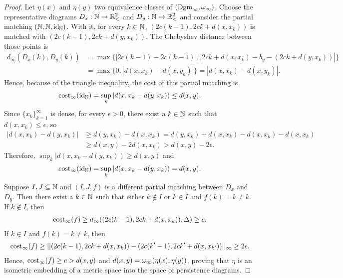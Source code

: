 \begin{proof}
    Let $ \eta(x) $ and $ \eta(y) $ two equivalence classes of $ (\operatorname{Dgm}_\infty, \omega_\infty) $. Choose the representative diagrams $D_x : \mathbb N \to \mathbb{R}_<^2 $ and $D_y : \mathbb N \to \mathbb{R}_<^2 $ and consider the partial matching $ (\mathbb N, \mathbb N, \operatorname{id}_\mathbb N) $. With it, for every $ k \in \mathbb N $, $ (2c(k-1), 2ck + d(x, x_k)) $ is matched with $ (2c(k-1), 2ck + d(y, x_k)) $. The Chebyshev distance between those points is
    \begin{align*}
        d_\infty(D_x(k), D_y(k)) &= \max \{|2c(k-1) - 2c(k-1)|, |2ck + d(x, x_k) - b_y - (2ck + d(y, x_k))|\} \\
        &= \max \{0, |d(x, x_k) - d(x, y_k)|\} = |d(x, x_k) - d(x, y_k)|.
    \end{align*}
    Hence, because of the triangle inequality, the cost of this partial matching is
    \begin{align*}
        \operatorname{cost}_\infty(\operatorname{id}_\mathbb N) = \sup_k |d(x, x_k - d(y, x_k)) \leq d(x, y).
    \end{align*}
    Since $ \{ x_k \}_{k=1}^\infty $ is dense, for every $ \epsilon > 0 $, there exist a $ k \in \mathbb N $ such that $ d(x, x_k) \leq \epsilon $, so
    \begin{align*}
        |d(x, x_k) - d(y, x_k)| &\geq d(y, x_k) - d(x, x_k) = d(y, x_k) + d(x, x_k) - d(x, x_k) - d(x, x_k) \\
        &\geq d(x, y) - 2d(x, x_k) > d(x, y) - 2\epsilon. 
    \end{align*}
    Therefore, $ \sup_k |d(x, x_k - d(y, x_k)) \geq d(x, y) $ and
    \begin{align*}
        \operatorname{cost}_\infty(\operatorname{id}_\mathbb N) = \sup_k |d(x, x_k - d(y, x_k)) = d(x, y).
    \end{align*}
    Suppose $ I, J \subseteq \mathbb N $ and $ (I, J, f) $ is a different partial matching between $ D_x $ and $ D_y $. Then there exist a $ k \in \mathbb N $ such that either $ k \notin I $ or $ k \in I $ and $ f(k) = k \neq k $. If $ k \notin I $, then
    \begin{align*}
        \operatorname{cost}_\infty(f) \geq d_\infty((2c(k-1), 2ck + d(x, x_k)), \Delta) \geq c.
    \end{align*}
    If $ k \in I$ and $ f(k) = k \neq k $, then
    \begin{align*}
        \operatorname{cost}_\infty(f) \geq || (2c(k-1), 2ck + d(x, x_k)) - (2c(k'-1), 2ck' + d(x, x_{k'}))||_\infty \geq 2 \epsilon.
    \end{align*}
    Hence, $ \operatorname{cost}_\infty(f) \geq c > d(x, y)$ and $d(x,y) = \omega_\infty(\eta(x), \eta(y)) $, proving that $ \eta $ is an isometric embedding of a metric space into the space of persistence diagrams.
\end{proof}
